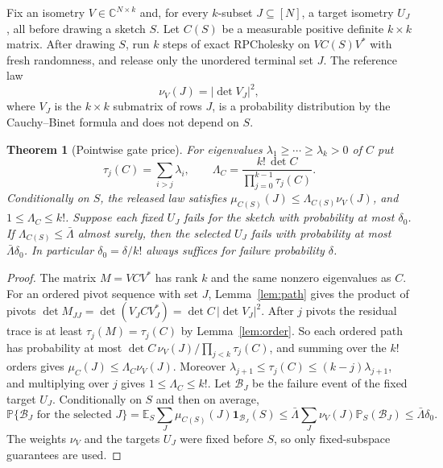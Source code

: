 \documentclass[11pt]{article}
\newtheorem{theorem}{Theorem}[section]
\theoremstyle{definition}\newtheorem{definition}[theorem]{Definition}
\theoremstyle{remark}\newtheorem{remark}[theorem]{Remark}
\newcommand{\C}{\mathbb C}
\newcommand{\E}{\mathbb E}
\newcommand{\Prob}{\mathbb P}
\newcommand{\1}{\mathbf 1}
\begin{document}
Fix an isometry $V\in\C^{N\times k}$ and, for every $k$-subset
$J\subseteq[N]$, a target isometry $U_J$, all before drawing a sketch
$S$. Let $C(S)$ be a measurable positive definite $k\times k$ matrix.
After drawing $S$, run $k$ steps of exact RPCholesky on $VC(S)V^*$ with
fresh randomness, and release only the unordered terminal set $J$. The
reference law
\[
 \nu_V(J)=|\det V_J|^2,
\]
where $V_J$ is the $k\times k$ submatrix of rows $J$, is a probability
distribution by the Cauchy--Binet formula and does not depend on $S$.

\begin{theorem}[Pointwise gate price]\label{thm:gate}
For eigenvalues $\lambda_1\ge\cdots\ge\lambda_k>0$ of $C$ put
\[
 \tau_j(C)=\sum_{i>j}\lambda_i,\qquad
 \Lambda_C=\frac{k!\,\det C}{\prod_{j=0}^{k-1}\tau_j(C)} .
\]
Conditionally on $S$, the released law satisfies
$\mu_{C(S)}(J)\le\Lambda_{C(S)}\nu_V(J)$, and $1\le\Lambda_C\le k!$.
Suppose each fixed $U_J$ fails for the sketch with probability at most
$\delta_0$. If $\Lambda_{C(S)}\le\bar\Lambda$ almost surely, then the
selected $U_J$ fails with probability at most $\bar\Lambda\delta_0$. In
particular $\delta_0=\delta/k!$ always suffices for failure probability
$\delta$.
\end{theorem}
\begin{proof}
The matrix $M=VCV^*$ has rank $k$ and the same nonzero eigenvalues as
$C$. For an ordered pivot sequence with set $J$, Lemma~\ref{lem:path}
gives the product of pivots $\det M_{JJ}=\det(V_JCV_J^*)=\det C\,|\det V_J|^2$.
After $j$ pivots the residual trace is at least $\tau_j(M)=\tau_j(C)$
by Lemma~\ref{lem:order}. So each ordered path has probability at most
$\det C\,\nu_V(J)/\prod_{j<k}\tau_j(C)$, and summing over the $k!$
orders gives $\mu_C(J)\le\Lambda_C\nu_V(J)$. Moreover
$\lambda_{j+1}\le\tau_j(C)\le(k-j)\lambda_{j+1}$, and multiplying over
$j$ gives $1\le\Lambda_C\le k!$. Let $\mathcal B_J$ be the failure event
of the fixed target $U_J$. Conditionally on $S$ and then on average,
\[
 \Prob\{\mathcal B_J\text{ for the selected }J\}
 =\E_S\sum_J\mu_{C(S)}(J)\1_{\mathcal B_J}(S)
 \le\bar\Lambda\sum_J\nu_V(J)\Prob_S(\mathcal B_J)\le\bar\Lambda\delta_0 .
\]
The weights $\nu_V$ and the targets $U_J$ were fixed before $S$, so only
fixed-subspace guarantees are used.
\end{proof}
\end{document}
